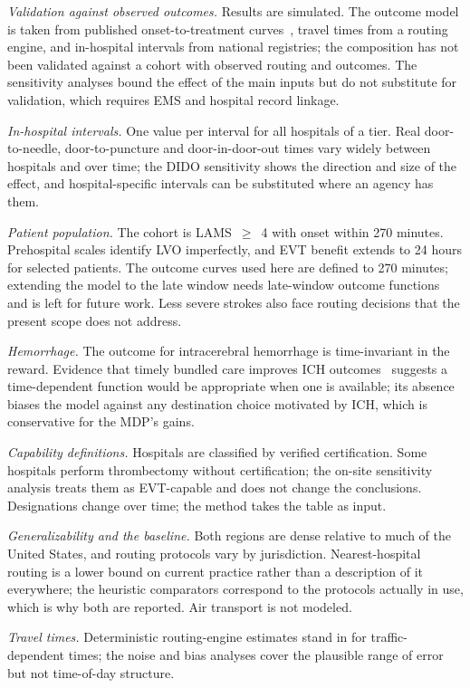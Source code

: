 \emph{Validation against observed outcomes.} Results are simulated. The outcome model is taken from published onset-to-treatment curves~\cite{holodinsky2018}, travel times from a routing engine, and in-hospital intervals from national registries; the composition has not been validated against a cohort with observed routing and outcomes. The sensitivity analyses bound the effect of the main inputs but do not substitute for validation, which requires EMS and hospital record linkage.

\emph{In-hospital intervals.} One value per interval for all hospitals of a tier. Real door-to-needle, door-to-puncture and door-in-door-out times vary widely between hospitals and over time; the DIDO sensitivity shows the direction and size of the effect, and hospital-specific intervals can be substituted where an agency has them.

\emph{Patient population.} The cohort is LAMS~$\geq$~4 with onset within 270 minutes. Prehospital scales identify LVO imperfectly, and EVT benefit extends to 24 hours for selected patients. The outcome curves used here are defined to 270 minutes; extending the model to the late window needs late-window outcome functions and is left for future work. Less severe strokes also face routing decisions that the present scope does not address.

\emph{Hemorrhage.} The outcome for intracerebral hemorrhage is time-invariant in the reward. Evidence that timely bundled care improves ICH outcomes~\cite{interact3} suggests a time-dependent function would be appropriate when one is available; its absence biases the model against any destination choice motivated by ICH, which is conservative for the MDP's gains.

\emph{Capability definitions.} Hospitals are classified by verified certification. Some hospitals perform thrombectomy without certification; the on-site sensitivity analysis treats them as EVT-capable and does not change the conclusions. Designations change over time; the method takes the table as input.

\emph{Generalizability and the baseline.} Both regions are dense relative to much of the United States, and routing protocols vary by jurisdiction. Nearest-hospital routing is a lower bound on current practice rather than a description of it everywhere; the heuristic comparators correspond to the protocols actually in use, which is why both are reported. Air transport is not modeled.

\emph{Travel times.} Deterministic routing-engine estimates stand in for traffic-dependent times; the noise and bias analyses cover the plausible range of error but not time-of-day structure.

